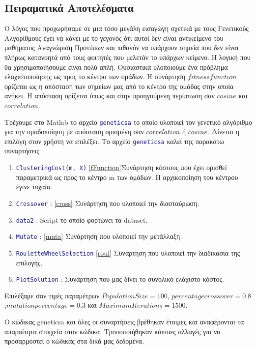 \subsection{Πειραματικά Αποτελέσματα}
Ο λόγος που προχωρήσαμε σε μια τόσο μεγάλη εισαγώγη σχετικά με τους Γενετικούς Αλγορίθμους έχει να κάνει με το γεγονός ότι αυτοί δεν είναι αντικείμενο του μαθήματος Αναγνώριση Προτύπων και πιθανόν να υπάρχουν σημεία που δεν είναι πλήρως κατανοητά από τους φοιτητές που μελετάν το υπάρχων κείμενο. Η λογική που θα χρησιμοποιήσουμε είναι πολύ απλή. Ουσιαστικά υλοποιούμε ένα πρόβλημα ελαχιστοποίησης ως προς το κέντρο των ομάδων. Η συνάρτηση $fitness function$ ορίζεται ως η απόσταση των σημείων μας από το κέντρο της ομάδας στην οποία ανήκει. H απόσταση ορίζεται όπως και στην προηγούμενη περίπτωση σαν $cosine$ και $correlation$.

Τρέχουμε στο Matlab το αρχείο \lstinline[language=MATLAB]!geneticsa! το οποίο υλοποιεί τον γενετικό αλγόριθμο για την ομαδοποίηση με απόσταση ορισμένη σαν $correlation$ ή $cosine$. Δίνεται η επιλόγη στον χρήστη να επιλέξει. Το αρχείο \lstinline[language=MATLAB]!geneticsa! καλεί της παρακάτω συναρτήσεις
\begin{enumerate}
\item \lstinline[language=MATLAB]!ClusteringCost(m, X)!
\ref{fFunction}{Συνάρτηση κόστους} που έχει ορισθεί παραμετρικά ως προς το κέντρο m των ομάδων. Η αρχικοποίηση του κέντρου έγινε τυχαία.
\item \lstinline[language=MATLAB]!Crossover! : \ref{cross} Συνάρτηση που υλοποιεί την διασταύρωση.
\item  \lstinline[language=MATLAB]!data2! : Script το οποίο φορτώνει τα dataset.
\item  \lstinline[language=MATLAB]!Mutate! : \ref{muta} Συνάρτηση που υλοποιεί την μετάλλαξη.
\item \lstinline[language=MATLAB]!RouletteWheelSelection! \ref{roul} Συνάρτηση που υλοποιεί την διαδικασία της επιλογής.
\item \lstinline[language=MATLAB]!PlotSolution! : Συνάρτηση που μας δίνει το συνολικό ελάχιστο κόστος.
\end{enumerate}  

Επιλέξαμε σαν τιμές παραμέτρων $Population Size =100$, $percentage crossover=0.8$,$mutation percentage=0.3$ και $Maximum Iterations=1500$.

Ο κώδικας geneticsa και όλες οι συναρτήσεις βρέθηκαν έτοιμες και αναφέρονται τα απαραίτητα στοιχεία στον κώδικα. Τροποποιήθηκαν κάποιες αλλαγές για να προσαρμοστεί ο κώδικας στα δικά μας δεδομένα.

